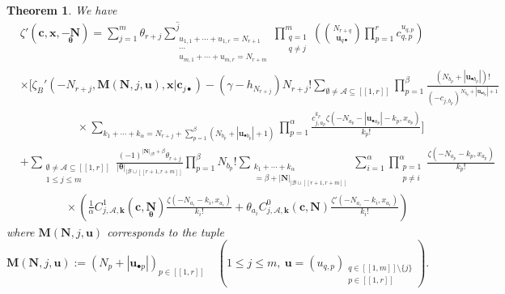 \documentclass[a4paper]{amsart}
\newtheorem{maintheorem}{Theorem}
\theoremstyle{remark}
\theoremstyle{definition}
\begin{document}
\begin{maintheorem}
\label{th:directional_derivative_values_mzf}
We have
\begin{align}
    & \zeta'(\mathbf{c},\mathbf{x},\underset{\bm{\theta}}{-\mathbf{N}}) = \sum_{j=1}^{m} \theta_{r+j} \sum^{\widehat{j}}_{\substack{u_{1,1}+\cdots+u_{1,r}=N_{r+1} \\ \cdots \\ u_{m,1}+\cdots+u_{m,r}=N_{r+m}}} \prod_{\substack{ q=1 \\ q \neq j}}^{m} \left( \binom{N_{r+q}}{\mathbf{u}_{q\bullet}} \prod_{p=1}^{r} c_{q,p}^{u_{q,p}} \right) \label{eq:zeta_prime_N} \\
    & \times \Bigg[ \zeta_B'(-N_{r+j},\mathbf{M}(\mathbf{N},j,\mathbf{u}),\mathbf{x}|\mathbf{c}_{j\bullet})- (\gamma-h_{N_{r+j}}) N_{r+j}! \sum_{\emptyset \neq \mathcal{A} \subseteq [\![1,r]\!]} \prod_{p=1}^{\beta} \frac{(N_{b_p}+|\mathbf{u}_{\bullet b_p}|)!}{(-c_{j,b_p})^{N_{b_p}+|\mathbf{u}_{\bullet b_p}|+1}} \nonumber \\
    & \qquad \qquad \quad \times \sum_{k_1+\cdots+k_{\alpha}= N_{r+j}+\sum_{p=1}^{\beta} (N_{b_p}+|\mathbf{u}_{\bullet b_p}|+1)} \prod_{p=1}^{\alpha} \frac{c_{j,a_p}^{k_p}\zeta(- N_{a_p}-|\mathbf{u}_{\bullet a_p}|-k_p,x_{a_p})}{k_p!} \Bigg] \nonumber \\
    & + \sum_{\substack{\emptyset \neq \mathcal{A} \subseteq [\![1,r]\!] \\ 1 \leq j \leq m}} \frac{(-1)^{|\mathbf{N}|_{|\mathcal{B}}+ \beta}\theta_{r+j}}{|\bm{\theta}|_{|\mathcal{B}\cup[\![r+1,r+m]\!]}} \prod_{p=1}^{\beta} N_{b_p}! \sum_{\substack{k_1+\cdots+k_{\alpha} \\ = \beta + |\mathbf{N}|_{|\mathcal{B}\cup [\![ r+1,r+m ]\!]}}} \sum_{i=1}^{\alpha} \prod_{\substack{p=1 \\ p \neq i}}^{\alpha} \frac{\zeta(-N_{a_p}-k_p,x_{a_p})}{k_p!} \nonumber \\
    & \qquad \qquad \times \left( \frac{1}{\alpha} C^1_{j,\mathcal{A},\mathbf{k}}(\mathbf{c},\underset{\bm{\theta}}{\mathbf{N}}) \frac{\zeta(-N_{a_i}-k_i,x_{a_i})}{k_i!} + \theta_{a_i} C^0_{j,\mathcal{A},\mathbf{k}}(\mathbf{c},\mathbf{N}) \frac{\zeta'(-N_{a_i}-k_i,x_{a_i})}{k_i!} \right) \nonumber
\end{align}
where $\mathbf{M}(\mathbf{N},j,\mathbf{u})$ corresponds to the tuple 
\begin{equation}
    \mathbf{M}(\mathbf{N},j,\mathbf{u}) := (N_p+|\mathbf{u}_{\bullet p}|)_{p \in [\![1,r]\!]} \quad (1 \leq j \leq m, \  \mathbf{u}=(u_{q,p})_{\substack{q \in [\![1,m]\!] \setminus \{ j \} \\ p \in [\![ 1,r ]\!]}}). \label{eq:def_tuple_M}
\end{equation}
\end{maintheorem}
\end{document}
